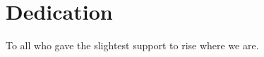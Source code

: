 \chapter*{Dedication}

\begin{center}
	\vspace{100mm}
	To all who gave the slightest support to rise where we are.
\end{center}

